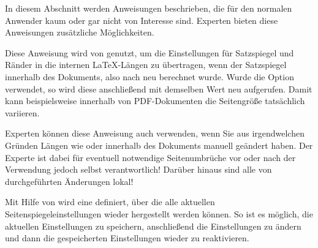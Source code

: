 In diesem Abschnitt werden Anweisungen beschrieben, die für den normalen
Anwender kaum oder gar nicht von Interesse sind. Experten bieten diese
Anweisungen zusätzliche Möglichkeiten.

\begin{Declaration}
\end{Declaration}%
Diese Anweisung wird von  genutzt, um die Einstellungen für
Satzspiegel und Ränder in die internen \LaTeX-Längen zu übertragen, wenn der
Satzspiegel innerhalb des Dokuments, also nach
 neu berechnet wurde. Wurde die Option
 verwendet, so wird diese anschließend mit
demselben Wert neu aufgerufen. Damit kann beispielsweise innerhalb von
PDF-Dokumenten die Seitengröße tatsächlich variieren.

Experten können diese Anweisung auch verwenden, wenn Sie aus irgendwelchen
Gründen Längen wie  oder  innerhalb des
Dokuments manuell geändert haben. Der Experte ist dabei für eventuell
notwendige Seitenumbrüche vor oder nach der Verwendung jedoch selbst
verantwortlich! Darüber hinaus sind alle von 
durchgeführten Änderungen lokal!%
\EndIndexGroup


\begin{Declaration}
\end{Declaration}
Mit Hilfe von  wird eine  definiert, über
die alle aktuellen Seitenspiegeleinstellungen wieder hergestellt werden
können. So ist es möglich, die aktuellen Einstellungen zu speichern,
anschließend die Einstellungen zu ändern und dann die gespeicherten
Einstellungen wieder zu reaktivieren.

